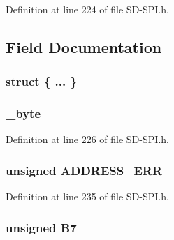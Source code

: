 Definition at line 224 of file S\+D-\/\+S\+P\+I.\+h.



\subsection{Field Documentation}
\hypertarget{union_r_e_s_p_o_n_s_e__1_a69fa69a5ec4144963be7b2442f17e09e}{}\subsubsection[{"@19}]{\setlength{\rightskip}{0pt plus 5cm}struct \{ ... \} }\label{union_r_e_s_p_o_n_s_e__1_a69fa69a5ec4144963be7b2442f17e09e}
\hypertarget{union_r_e_s_p_o_n_s_e__1_aad6b25752650539bbd15773c4b71b4d4}{}
\subsubsection[{\+\_\+byte}]{ \+\_\+byte}\label{union_r_e_s_p_o_n_s_e__1_aad6b25752650539bbd15773c4b71b4d4}


Definition at line 226 of file S\+D-\/\+S\+P\+I.\+h.

\hypertarget{union_r_e_s_p_o_n_s_e__1_a245b3cd89542e3152c04b924b8aa2446}{}
\subsubsection[{A\+D\+D\+R\+E\+S\+S\+\_\+\+E\+R\+R}]{\setlength{\rightskip}{0pt plus 5cm}unsigned A\+D\+D\+R\+E\+S\+S\+\_\+\+E\+R\+R}\label{union_r_e_s_p_o_n_s_e__1_a245b3cd89542e3152c04b924b8aa2446}


Definition at line 235 of file S\+D-\/\+S\+P\+I.\+h.

\hypertarget{union_r_e_s_p_o_n_s_e__1_afc348e9a96bdf6c375205eb63ce6ab06}{}
\subsubsection[{B7}]{\setlength{\rightskip}{0pt plus 5cm}unsigned B7}\label{union_r_e_s_p_o_n_s_e__1_afc348e9a96bdf6c375205eb63ce6ab06}


